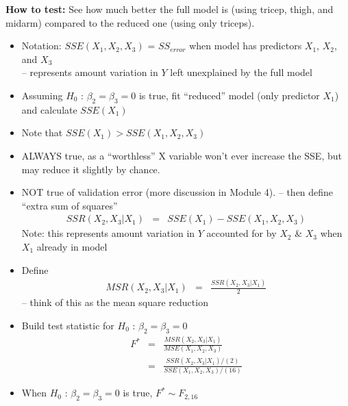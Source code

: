 \documentclass[12pt]{../notes}
\begin{document}
\nspace
\textbf{How to test:} See how much better the full model is (using tricep, thigh, and midarm) compared to the reduced one (using only triceps). 
\begin{itemize}
  \item Notation: $SSE(X_1,X_2,X_3)$ = $SS_{error}$ when model has
  predictors $X_1$, $X_2$, and $X_3$\\
  -- represents amount variation in $Y$ left unexplained by the full model
  \item Assuming $H_0$ : $\beta_2=\beta_3=0$ is true, fit
  ``reduced'' model (only predictor $X_1$) and calculate
  $SSE(X_1)$
  \item Note that $SSE(X_1) > 
  SSE(X_1,X_2,X_3)$\\
\bi
\item ALWAYS true, as a ``worthless'' X variable won't ever increase the SSE, but may reduce it slightly by chance. 
\item NOT true of validation error (more discussion in Module 4). 
\ei
  -- then define ``extra sum of squares''
  \begin{eqnarray}
    SSR(X_2,X_3 | X_1) & = & SSE(X_1) - SSE(X_1,X_2,X_3) \nonumber
  \end{eqnarray}
  Note: this represents amount variation in $Y$ accounted for by
  $X_2$ \& $X_3$ when $X_1$ already in model
  \item Define
  \begin{eqnarray}
    MSR(X_2,X_3 | X_1) & = & \frac{SSR(X_2,X_3|X_1)}{2} \nonumber
  \end{eqnarray}
  -- think of this as the mean square reduction\\ \vspace{2em}
  \item Build test statistic for $H_0$ : $\beta_2=\beta_3=0$
  \begin{eqnarray}
     F^* & = & \frac{MSR(X_2,X_3 | X_1)}{MSE(X_1,X_2,X_3)} \nonumber    \\
         & = & \frac{SSR(X_2,X_3|X_1) / (2)}{SSE(X_1,X_2,X_3) / (16)} \nonumber
  \end{eqnarray}

  \item When $H_0$ : $\beta_2=\beta_3=0$  is true, $F^* \sim
  F_{2,16}$
\end{itemize}
\end{document}
